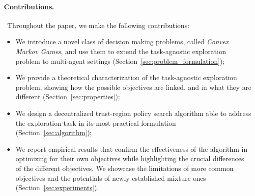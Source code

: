 \paragraph*{Contributions.}~Throughout the paper, we make the following contributions:
\begin{itemize}[itemsep=-1pt, leftmargin=*, topsep=2pt]
    \item We introduce a novel class of decision making problems, called \emph{Convex Markov Games}, and use them to extend the task-agnostic exploration problem to multi-agent settings (Section~\ref{sec:problem_formulation});
    \item We provide a theoretical characterization of the task-agnostic exploration problem, showing how the possible objectives are linked, and in what they are different (Section~\ref{sec:properties});
    \item We design a decentralized trust-region policy search algorithm able to address the exploration task in its most practical formulation (Section~\ref{sec:algorithm});
    \item We report empirical results that confirm the effectiveness of the algorithm in optimizing for their own objectives while highlighting the crucial differences of the different objectives. We showcase the limitations of more common objectives and the potentials of newly established mixture ones (Section~\ref{sec:experiments}).
\end{itemize}